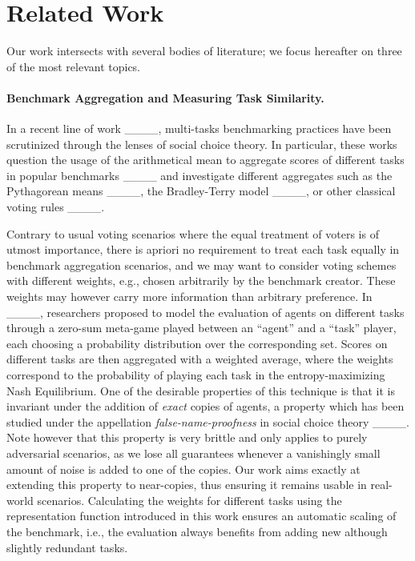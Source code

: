 \section{Related Work}
Our work intersects with several bodies of literature; we focus hereafter on 
three of the most relevant topics.



\paragraph{Benchmark Aggregation and Measuring Task Similarity.}

In a recent line of work ____, multi-tasks benchmarking practices have been scrutinized through the lenses of social choice theory. In particular, these works question the usage of the arithmetical mean to aggregate scores of different tasks in popular benchmarks ____
and investigate different aggregates such as the Pythagorean means ____, the Bradley-Terry model ____, or other classical voting rules ____.

Contrary to usual voting scenarios where the equal treatment of voters is of utmost importance, there is apriori no requirement to treat each task equally in benchmark aggregation scenarios, and we may want to consider voting schemes with different weights, e.g., chosen arbitrarily by the benchmark creator.
These weights may however carry more information than arbitrary preference. In ____, researchers proposed to model the evaluation of agents on different tasks through a zero-sum meta-game played between an ``agent'' and a ``task'' player, each choosing a probability distribution over the corresponding set. Scores on different tasks are then aggregated with a weighted average, where the weights correspond to the probability of playing each task in the entropy-maximizing Nash Equilibrium. One of the desirable properties of this technique is that it is invariant under the addition of \emph{exact} copies of agents, a property which has been studied under the appellation \emph{false-name-proofness} in social choice theory ____. Note however that this property is very brittle and only applies to purely adversarial scenarios, as we lose all guarantees whenever a vanishingly small amount of noise is added to one of the copies. 
Our work aims exactly at extending this property to near-copies, thus ensuring it remains usable in real-world scenarios. Calculating the weights for different tasks using the representation function introduced in this work ensures an automatic scaling of the benchmark, i.e., the evaluation always benefits from adding new although slightly redundant tasks.


